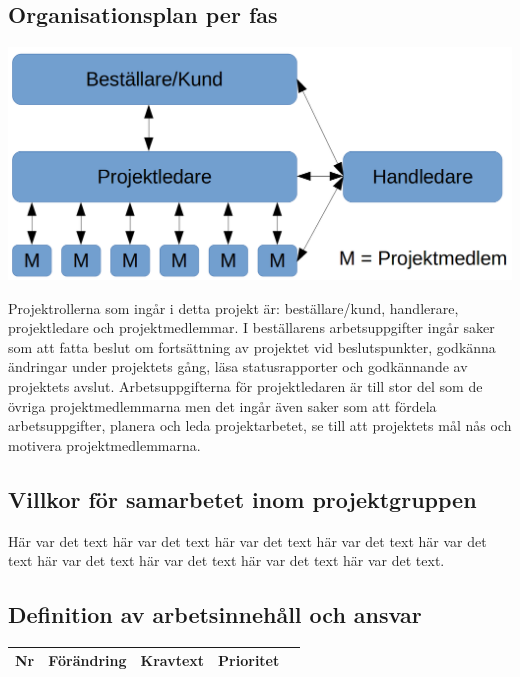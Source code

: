 \documentclass[a4paper,titlepage,12pt]{article}
\begin{document}
	\subsection{Organisationsplan per fas}
	\begin{center}
		\includegraphics[width=0.8\linewidth]{images/projectroles.png}
	\end{center}
	Projektrollerna som ingår i detta projekt är: beställare/kund, handlerare,
	projektledare och projektmedlemmar. I beställarens arbetsuppgifter ingår saker
	som att fatta beslut om fortsättning av projektet vid beslutspunkter, godkänna
	ändringar under projektets gång, läsa statusrapporter och godkännande av
	projektets avslut. Arbetsuppgifterna för projektledaren är till stor del som
	de övriga projektmedlemmarna men det ingår även saker som att fördela
	arbetsuppgifter, planera och leda projektarbetet, se till att projektets mål
	nås och motivera projektmedlemmarna.
	
	 
	\subsection{Villkor för samarbetet inom projektgruppen}
	Här var det text här var det text här var det text
	här var det text här var det text här var det text
	här var det text här var det text här var det text.
	
	\subsection{Definition av arbetsinnehåll och ansvar}
	\begin{longtable}[c]{ c l>{\raggedright}p{} l l}
		\textbf{Nr} & \textbf{Förändring} & \textbf{Kravtext} & \textbf{Prioritet} 
			\\ \midrule

	\end{longtable}
	
\end{document}
